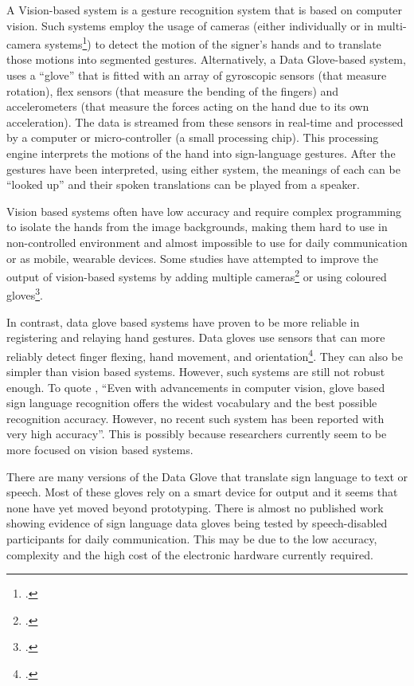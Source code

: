 A Vision-based system is a gesture recognition system that is based on computer vision. Such systems employ the usage of cameras (either individually or in multi-camera systems\footcite{Vogler1998}) to detect the motion of the signer's hands and to translate those motions into segmented gestures. Alternatively, a Data Glove-based system, uses a ``glove'' that is fitted with an array of gyroscopic sensors (that measure rotation), flex sensors (that measure the bending of the fingers) and accelerometers (that measure the forces acting on the hand due to its own acceleration). The data is streamed from these sensors in real-time and processed by a computer or micro-controller (a small processing chip). This processing engine interprets the motions of the hand into sign-language gestures. After the gestures have been interpreted, using either system, the meanings of each can be ``looked up'' and their spoken translations can be played from a speaker.

Vision based systems often have low accuracy and require complex programming to isolate the hands from the image backgrounds, making them hard to use in non-controlled environment and almost impossible to use for daily communication or as mobile, wearable devices. Some studies have attempted to improve the output of vision-based systems by adding multiple cameras\footcite{Vogler1998} or using coloured gloves\footcite{Starner1998}.

In contrast, data glove based systems have proven to be more reliable in registering and relaying hand gestures. Data gloves use sensors that can more reliably detect finger flexing, hand movement, and orientation\footcite{AnethaK2014}. They can also be simpler than vision based systems. However, such systems are still not robust enough. To quote \citeauthor{Premaratne2010}, ``Even with advancements in computer vision, glove based sign language recognition offers the widest vocabulary and the best possible recognition accuracy. However, no recent such system has been reported with very high accuracy''. This is possibly because researchers currently seem to be more focused on vision based systems.

There are many versions of the Data Glove that translate sign language to text or speech. Most of these gloves rely on a smart device for output and it seems that none have yet moved beyond prototyping. There is almost no published work showing evidence of sign language data gloves being tested by speech-disabled participants for daily communication. This may be due to the low accuracy, complexity and the high cost of the electronic hardware currently required.

